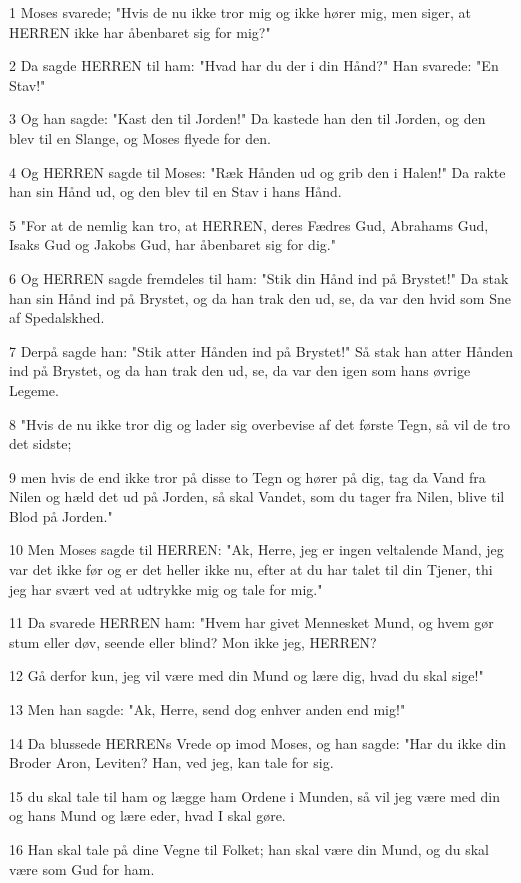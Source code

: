 \par 1 Moses svarede; "Hvis de nu ikke tror mig og ikke hører mig, men siger, at HERREN ikke har åbenbaret sig for mig?"
\par 2 Da sagde HERREN til ham: "Hvad har du der i din Hånd?" Han svarede: "En Stav!"
\par 3 Og han sagde: "Kast den til Jorden!" Da kastede han den til Jorden, og den blev til en Slange, og Moses flyede for den.
\par 4 Og HERREN sagde til Moses: "Ræk Hånden ud og grib den i Halen!" Da rakte han sin Hånd ud, og den blev til en Stav i hans Hånd.
\par 5 "For at de nemlig kan tro, at HERREN, deres Fædres Gud, Abrahams Gud, Isaks Gud og Jakobs Gud, har åbenbaret sig for dig."
\par 6 Og HERREN sagde fremdeles til ham: "Stik din Hånd ind på Brystet!" Da stak han sin Hånd ind på Brystet, og da han trak den ud, se, da var den hvid som Sne af Spedalskhed.
\par 7 Derpå sagde han: "Stik atter Hånden ind på Brystet!" Så stak han atter Hånden ind på Brystet, og da han trak den ud, se, da var den igen som hans øvrige Legeme.
\par 8 "Hvis de nu ikke tror dig og lader sig overbevise af det første Tegn, så vil de tro det sidste;
\par 9 men hvis de end ikke tror på disse to Tegn og hører på dig, tag da Vand fra Nilen og hæld det ud på Jorden, så skal Vandet, som du tager fra Nilen, blive til Blod på Jorden."
\par 10 Men Moses sagde til HERREN: "Ak, Herre, jeg er ingen veltalende Mand, jeg var det ikke før og er det heller ikke nu, efter at du har talet til din Tjener, thi jeg har svært ved at udtrykke mig og tale for mig."
\par 11 Da svarede HERREN ham: "Hvem har givet Mennesket Mund, og hvem gør stum eller døv, seende eller blind? Mon ikke jeg, HERREN?
\par 12 Gå derfor kun, jeg vil være med din Mund og lære dig, hvad du skal sige!"
\par 13 Men han sagde: "Ak, Herre, send dog enhver anden end mig!"
\par 14 Da blussede HERRENs Vrede op imod Moses, og han sagde: "Har du ikke din Broder Aron, Leviten? Han, ved jeg, kan tale for sig.
\par 15 du skal tale til ham og lægge ham Ordene i Munden, så vil jeg være med din og hans Mund og lære eder, hvad I skal gøre.
\par 16 Han skal tale på dine Vegne til Folket; han skal være din Mund, og du skal være som Gud for ham.
